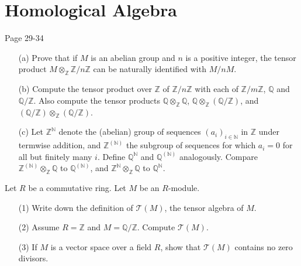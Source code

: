 \chapter{Homological Algebra}

Page 29-34



\begin{prob}[S2012-Q2]
    \phantom{text}
    \begin{itemize}
        \item[(a)] Prove that if \(M\) is an abelian group and \(n\) is a positive integer, the tensor product \(M\otimes_{\mathbb{Z}}\mathbb{Z}/n\mathbb{Z}\) can be naturally identified with \(M/nM\).
        \item[(b)] Compute the tensor product over \(\mathbb{Z}\) of \(\mathbb{Z}/n\mathbb{Z}\) with each of \(\mathbb{Z}/m\mathbb{Z}\), \(\mathbb{Q}\) and \(\mathbb{Q}/\mathbb{Z}\). Also compute the tensor products \(\mathbb{Q}\otimes_{\mathbb{Z}}\mathbb{Q}\), \(\mathbb{Q}\otimes_{\mathbb{Z}}(\mathbb{Q}/\mathbb{Z})\), and \((\mathbb{Q}/\mathbb{Z})\otimes_{\mathbb{Z}}(\mathbb{Q}/\mathbb{Z})\).
        \item[(c)] Let \(\mathbb{Z}^\mathbb{N}\) denote the (abelian) group of sequences \((a_i)_{i\in\mathbb{N}}\) in \(\mathbb{Z}\) under termwise addition, and \(\mathbb{Z}^{(\mathbb{N})}\) the subgroup of sequences for which \(a_i = 0\) for all but finitely many \(i\). Define \(\mathbb{Q}^\mathbb{N}\) and \(\mathbb{Q}^{(\mathbb{N})}\) analogously. Compare \(\mathbb{Z}^{(\mathbb{N})}\otimes_{\mathbb{Z}}\mathbb{Q}\) to \(\mathbb{Q}^{(\mathbb{N})}\), and \(\mathbb{Z}^\mathbb{N}\otimes_{\mathbb{Z}}\mathbb{Q}\) to \(\mathbb{Q}^\mathbb{N}\).
    \end{itemize}
\end{prob}

\begin{prob}[F2006-Q4]
    Let \(R\) be a commutative ring. Let \(M\) be an \(R\)-module.
    \begin{itemize}
        \item[(1)] Write down the definition of \(\mathcal{T}(M)\), the tensor algebra of \(M\).
        \item[(2)] Assume \(R = \mathbb{Z}\) and \(M = \mathbb{Q}/\mathbb{Z}\). Compute \(\mathcal{T}(M)\).
        \item[(3)] If \(M\) is a vector space over a field \(R\), show that \(\mathcal{T}(M)\) contains no zero divisors.
    \end{itemize}
\end{prob}

